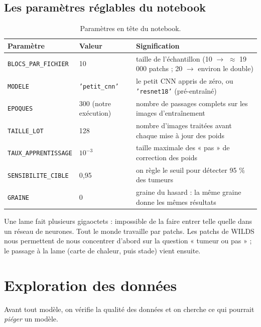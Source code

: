 \documentclass[11pt,a4paper]{article}
\begin{document}
\subsection{Les paramètres réglables du notebook}
\begin{table}[H]
\centering
\begin{tabularx}{\textwidth}{llX}
\toprule
\textbf{Paramètre} & \textbf{Valeur} & \textbf{Signification} \\
\midrule
\texttt{BLOCS\_PAR\_FICHIER} & 10 & taille de l'échantillon (10 $\to$ $\approx$ 19\,000 patchs ; 20 $\to$ environ le double) \\
\texttt{MODELE} & \texttt{'petit\_cnn'} & le petit CNN appris de zéro, ou \texttt{'resnet18'} (pré-entraîné) \\
\texttt{EPOQUES} & 300 (notre exécution) & nombre de passages complets sur les images d'entraînement \\
\texttt{TAILLE\_LOT} & 128 & nombre d'images traitées avant chaque mise à jour des poids \\
\texttt{TAUX\_APPRENTISSAGE} & $10^{-3}$ & taille maximale des « pas » de correction des poids \\
\texttt{SENSIBILITE\_CIBLE} & 0,95 & on règle le seuil pour détecter 95 \% des tumeurs \\
\texttt{GRAINE} & 0 & graine du hasard : la même graine donne les mêmes résultats \\
\bottomrule
\end{tabularx}
\caption{Paramètres en tête du notebook.}
\end{table}

\begin{oral}
Une lame fait plusieurs gigaoctets : impossible de la faire entrer telle quelle dans un réseau de neurones.
Tout le monde travaille par patchs. Les patchs de WILDS nous permettent de nous concentrer d'abord sur la
question « tumeur ou pas » ; le passage à la lame (carte de chaleur, puis stade) vient ensuite.
\end{oral}

\section{Exploration des données}
Avant tout modèle, on vérifie la qualité des données et on cherche ce qui pourrait \emph{piéger} un modèle.
\end{document}
